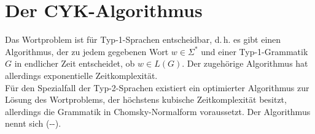 \pagebreak

\section{%
    Der CYK-Algorithmus%
}

\begin{Bem}
    Das Wortproblem ist für Typ-1-Sprachen entscheidbar, d.\,h.
    es gibt einen Algorithmus, der zu jedem gegebenen Wort $w \in \Sigma^\ast$
    und einer Typ-1-Grammatik $G$ in endlicher Zeit entscheidet, ob
    $w \in L(G)$.
    Der zugehörige Algorithmus hat allerdings exponentielle Zeitkomplexität.\\
    Für den Spezialfall der Typ-2-Sprachen existiert ein optimierter
    Algorithmus zur Lösung des Wortproblems, der höchstens kubische
    Zeitkomplexität besitzt, allerdings die Grammatik in Chomsky-Normalform
    voraussetzt.
    Der Algorithmus nennt sich 
    (--).
\end{Bem}

\linie

